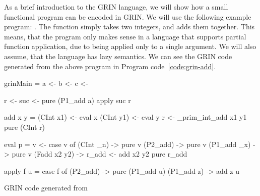 \documentclass[main.tex]{subfiles}
\begin{document}
	As a brief introduction to the GRIN language, we will show how a small functional program can be encoded in GRIN. We will use the following example program: . The  function simply takes two integers, and adds them together. This means, that the program only makes sense in a language that supports partial function application, due to  being applied only to a single argument. We will also assume, that the language has lazy semantics. We can see the GRIN code generated from the above program in Program code~\ref{code:grin-add}.
	
	\hspace{-0.5cm}
	\begin{codeFloat}
		\begin{minipage}{0.48\textwidth}
			\begin{haskell}
	      grinMain =
	        a <- %
	        b <- %
	        c <- %
	        
	        r <- %
	        suc <- pure (P1_add a)
	        apply suc r
	
	      add x y =
	        (CInt x1) <- eval x
	        (CInt y1) <- eval y
	        r <- _prim_int_add x1 y1
	        pure (CInt r)
			\end{haskell}
		\end{minipage}
		\hfill
		\begin{minipage}{0.50\textwidth}
			\begin{haskellNum}{12}
	     eval p =
	       v <- %
	       case v of
	         (CInt _n)   -> pure v
	         (P2_add)    -> pure v
	         (P1_add _x) -> pure v
	         (Fadd x2 y2) ->
	           r_add <- add x2 y2
	           pure r_add
	       
	     apply f u =
	       case f of
	         (P2_add) -> 
	           pure (P1_add u)
	         (P1_add z) -> add z u
			\end{haskellNum}
		\end{minipage}
		\caption{GRIN code generated from }
		\label{code:grin-add}
		
	\end{codeFloat}
		
\end{document}
